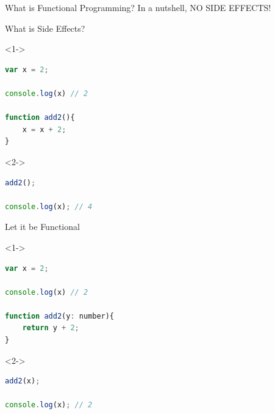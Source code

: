 \documentclass[10pt]{beamer}
\begin{document}

\begin{frame}{What is Functional Programming?}
In a nutshell,
\Huge{
NO SIDE EFFECTS!}
\end{frame}



\begin{frame}[fragile]{What is Side Effects?}

\begin{overlayarea}{\linewidth}{.8\textheight}

\begin{onlyenv}<1->
\begin{lstlisting}[language=JavaScript]
var x = 2;

console.log(x) // 2

function add2(){
    x = x + 2;
}
\end{lstlisting}
\end{onlyenv}

\begin{onlyenv}<2->
\begin{lstlisting}[language=JavaScript,firstnumber=8]
add2();

console.log(x); // 4
\end{lstlisting}
\end{onlyenv}


\end{overlayarea}  
    
\end{frame}



\begin{frame}[fragile]{Let it be Functional}

\begin{overlayarea}{\linewidth}{.8\textheight}

\begin{onlyenv}<1->
\begin{lstlisting}[language=JavaScript]
var x = 2;

console.log(x) // 2

function add2(y: number){
    return y + 2;
}
\end{lstlisting}
\end{onlyenv}

\begin{onlyenv}<2->
\begin{lstlisting}[language=JavaScript,firstnumber=8]
add2(x);

console.log(x); // 2
\end{lstlisting}
\end{onlyenv}


\end{overlayarea}  

\end{frame}
\end{document}
